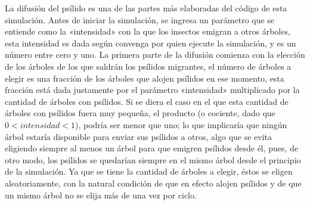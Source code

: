 La difusión del psílido es una de las partes más elaboradas del código de esta simulación. Antes de iniciar la simulación, se ingresa un parámetro que se entiende como la «intensidad» con la que los insectos emigran a otros árboles, esta intensidad es dada según convenga por quien ejecute la simulación, y es un número entre cero y uno. La primera parte de la difusión comienza con la elección de los árboles de los que saldrán los psílidos migrantes, el número de árboles a elegir es una fracción de los árboles que alojen psílidos en ese momento, esta fracción está dada justamente por el parámetro «intensidad» multiplicado por la cantidad de árboles con psílidos. Si se diera el caso en el que esta cantidad de árboles con psílidos fuera muy pequeña, el producto (o cociente, dado que $0<intensidad<1$), podría ser menor que uno; lo que implicaría que ningún árbol estaría disponible para enviar sus psílidos a otros, algo que se evita eligiendo siempre al menos un árbol para que emigren psílidos desde él, pues, de otro modo, los psílidos se quedarían siempre en el mismo árbol desde el principio de la simulación. Ya que se tiene la cantidad de árboles a elegir, éstos se eligen aleatoriamente, con la natural condición de que en efecto alojen psílidos y de que un mismo árbol no se elija más de una vez por ciclo.
